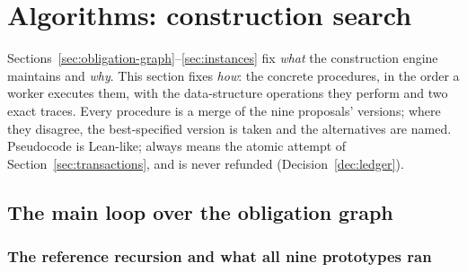 \section{Algorithms: construction search}\label{alg:search}

Sections~\ref{sec:obligation-graph}--\ref{sec:instances} fix \emph{what} the construction engine maintains and \emph{why}. This section fixes \emph{how}: the concrete procedures, in the order a worker executes them, with the data-structure operations they perform and two exact traces. Every procedure is a merge of the nine proposals' versions; where they disagree, the best-specified version is taken and the alternatives are named. Pseudocode is Lean-like;  always means the atomic attempt of Section~\ref{sec:transactions}, and  is never refunded (Decision~\ref{dec:ledger}).

\subsection{The main loop over the obligation graph}\label{alg:loop}

\subsubsection{The reference recursion and what all nine prototypes ran}

